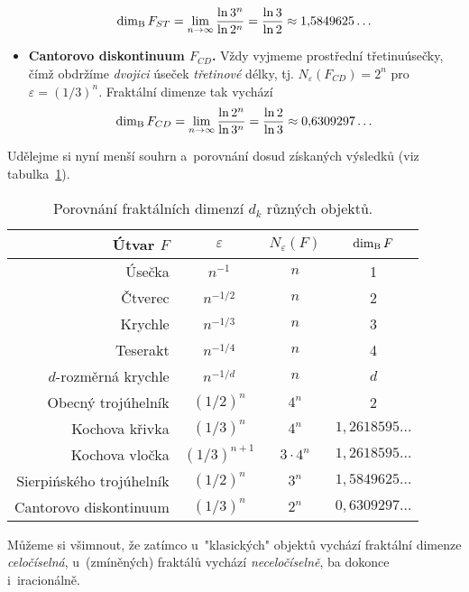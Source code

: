 \begin{itemize}
    \begin{equation}\label{eq:sierpinskeho-trojuhelnik-dimenze}
        \operatorname{dim_B}{F_{ST}}=\lim_{n\to\infty}{\dfrac{\ln{3^n}}{\ln{2^{n}}}}=\dfrac{\ln{3}}{\ln{2}}\approx 1{,}5849625\dots
    \end{equation}
    \item \textbf{Cantorovo diskontinuum $F_{CD}$.} Vždy vyjmeme prostřední třetinu\linebreak{}úsečky, čímž obdržíme \emph{dvojici} úseček \emph{třetinové} délky, tj. $N_\varepsilon(F_{CD})=2^n$ pro $\varepsilon=(1/3)^n$. Fraktální dimenze tak vychází
    \begin{equation}\label{eq:cantorovo-diskontinuum-dimenze}
        \operatorname{dim_B}{F_{CD}}=\lim_{n\to\infty}{\dfrac{\ln{2^n}}{\ln{3^n}}}=\dfrac{\ln{2}}{\ln{3}}\approx 0{,}6309297\dots
    \end{equation}
\end{itemize}
Udělejme si nyní menší souhrn a~porovnání dosud získaných výsledků (viz tabulka~\ref{table:fraktaly-eukleides-dimenze}).
\begin{table}[h]
    \centering
    \begin{tabular}{r|ccc}
        Útvar $F$                & $\varepsilon$ & $N_\varepsilon(F)$ & $\operatorname{dim_B}{F}$         \\ \hline
        Úsečka                   & $n^{-1}$      & $n$                & 1                  \\
        Čtverec                  & $n^{-1/2}$    & $n$                & 2                  \\
        Krychle                  & $n^{-1/3}$    & $n$                & 3                  \\
        Teserakt                 & $n^{-1/4}$    & $n$                & 4                  \\
        $d$-rozměrná krychle     & $n^{-1/d}$    & $n$                & $d$                \\
        Obecný trojúhelník       & $(1/2)^n$     & $4^n$              & 2                  \\
        Kochova křivka           & $(1/3)^n$     & $4^n$              & $1{,}2618595\dots$ \\
        Kochova vločka           & $(1/3)^{n+1}$ & $3\cdot 4^n$       & $1{,}2618595\dots$ \\
        Sierpińského trojúhelník & $(1/2)^n$     & $3^n$              & $1{,}5849625\dots$ \\
        Cantorovo diskontinuum   & $(1/3)^n$     & $2^n$              & $0{,}6309297\dots$ \\
    \end{tabular}
    \caption{Porovnání fraktálních dimenzí $d_k$ různých objektů.}
    \label{table:fraktaly-eukleides-dimenze}
\end{table}
Můžeme si všimnout, že zatímco u~"klasických" objektů vychází fraktální dimenze \emph{celočíselná}, u~(zmíněných) fraktálů vychází \emph{neceločíselně}, ba dokonce i~iracionálně.

